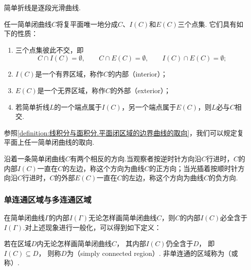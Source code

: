 \begin{example}
简单折线是逐段光滑曲线.
\end{example}

\begin{theorem}[若尔当定理]
任一简单闭曲线\(C\)将复平面唯一地分成\(C\)、\(I(C)\)和\(E(C)\)三个点集.
它们具有如下的性质：\begin{enumerate}
\item 三个点集彼此不交，即\begin{equation*}
C \cap I(C) = \emptyset,
\qquad
C \cap E(C) = \emptyset,
\qquad
I(C) \cap E(C) = \emptyset;
\end{equation*}
\item \(I(C)\)是一个有界区域，称作\(C\)的内部（interior）；
\item \(E(C)\)是一个无界区域，称作\(C\)的外部（exterior）；
\item 若简单折线\(L\)的一个端点属于\(I(C)\)，另一个端点属于\(E(C)\)，则\(L\)必与\(C\)相交.
\end{enumerate}
\end{theorem}

参照\cref{definition:线积分与面积分.平面闭区域的边界曲线的取向}，我们可以规定复平面上任一简单闭曲线的取向.
\begin{definition}
沿着一条简单闭曲线\(C\)有两个相反的方向.当观察者按逆时针方向沿\(C\)行进时，\(C\)的内部\(I(C)\)一直在\(C\)的左边，称这个方向为曲线\(C\)的正方向；当光插着按顺时针方向沿\(C\)行进时，\(C\)的外部\(E(C)\)一直在\(C\)的左边，称这个方向为曲线\(C\)的负方向.
\end{definition}

\subsubsection{单连通区域与多连通区域}
在简单闭曲线\(\Gamma\)的内部\(I(\Gamma)\)无论怎样画简单闭曲线\(C\)，则\(C\)的内部\(I(C)\)必全含于\(I(\Gamma)\).对上述现象进行一般化，可以得到如下定义：
\begin{definition}
若在区域\(D\)内无论怎样画简单闭曲线\(C\)，
其内部\(I(C)\)仍全含于\(D\)，
即\(I(C) \subseteq D\)，
则称\(D\)为（simply connected region）.
非单连通的区域称为（或称）.
\end{definition}

